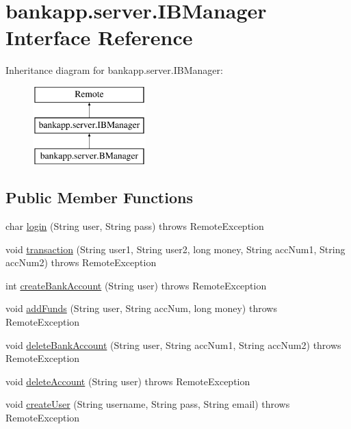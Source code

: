 \hypertarget{interfacebankapp_1_1server_1_1_i_b_manager}{}\section{bankapp.\+server.\+I\+B\+Manager Interface Reference}
\label{interfacebankapp_1_1server_1_1_i_b_manager}
Inheritance diagram for bankapp.\+server.\+I\+B\+Manager\+:\begin{figure}[H]
\begin{center}
\leavevmode
\includegraphics[height=3.000000cm]{interfacebankapp_1_1server_1_1_i_b_manager}
\end{center}
\end{figure}
\subsection*{Public Member Functions}
\begin{DoxyCompactItemize}
\item 
char \hyperlink{interfacebankapp_1_1server_1_1_i_b_manager_a96bce16e21db1585eb42a5ef55b43050}{login} (String user, String pass)  throws Remote\+Exception
\item 
void \hyperlink{interfacebankapp_1_1server_1_1_i_b_manager_a6ed6af471750f7c721d45ead983bef5d}{transaction} (String user1, String user2, long money, String acc\+Num1, String acc\+Num2)  throws Remote\+Exception
\item 
int \hyperlink{interfacebankapp_1_1server_1_1_i_b_manager_aeb423a1ba2348fdaa7d1466a907e82e1}{create\+Bank\+Account} (String user)  throws Remote\+Exception
\item 
void \hyperlink{interfacebankapp_1_1server_1_1_i_b_manager_a31f275bed15b74bb2bc6ef43ede7f7f8}{add\+Funds} (String user, String acc\+Num, long money)  throws Remote\+Exception
\item 
void \hyperlink{interfacebankapp_1_1server_1_1_i_b_manager_a7b1a8e3d663126a894a7c074f35e49d3}{delete\+Bank\+Account} (String user, String acc\+Num1, String acc\+Num2)  throws Remote\+Exception
\item 
void \hyperlink{interfacebankapp_1_1server_1_1_i_b_manager_aa1f1aee23930d78375c12496e9f47cdf}{delete\+Account} (String user)  throws Remote\+Exception
\item 
void \hyperlink{interfacebankapp_1_1server_1_1_i_b_manager_a09b3ca29b50f7c662e360a47cea220ae}{create\+User} (String username, String pass, String email)  throws Remote\+Exception
\end{DoxyCompactItemize}



